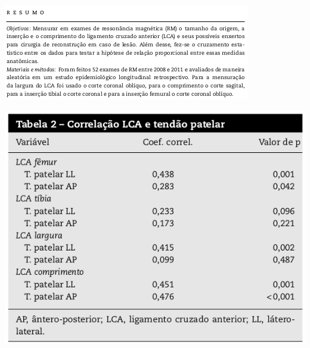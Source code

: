 \documentclass{beamer}
\begin{document}
\begin{frame}
  \begin{center}
    \includegraphics[width=\textwidth]{EDA/eda-exercicio2}
  \end{center}
\end{frame}

\begin{frame}
  \begin{center}
    \includegraphics[height=.9\textheight]{EDA/eda-exercicio3}
  \end{center}
\end{frame}
\end{document}
